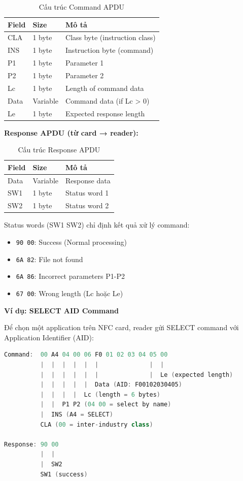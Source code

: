 \begin{table}[h]
\centering
\label{tab:command_apdu}
\begin{tabular}{|l|l|l|}
\hline
\textbf{Field} & \textbf{Size} & \textbf{Mô tả} \\
\hline
CLA & 1 byte & Class byte (instruction class) \\
INS & 1 byte & Instruction byte (command) \\
P1 & 1 byte & Parameter 1 \\
P2 & 1 byte & Parameter 2 \\
Lc & 1 byte & Length of command data \\
Data & Variable & Command data (if Lc > 0) \\
Le & 1 byte & Expected response length \\
\hline
\end{tabular}
\caption{Cấu trúc Command APDU}
\end{table}

\textbf{Response APDU (từ card → reader):}

\begin{table}[h]
\centering
\label{tab:response_apdu}
\begin{tabular}{|l|l|l|}
\hline
\textbf{Field} & \textbf{Size} & \textbf{Mô tả} \\
\hline
Data & Variable & Response data \\
SW1 & 1 byte & Status word 1 \\
SW2 & 1 byte & Status word 2 \\
\hline
\end{tabular}
\caption{Cấu trúc Response APDU}
\end{table}

Status words (SW1 SW2) chỉ định kết quả xử lý command:
\begin{itemize}
    \item \texttt{90 00}: Success (Normal processing)
    \item \texttt{6A 82}: File not found
    \item \texttt{6A 86}: Incorrect parameters P1-P2
    \item \texttt{67 00}: Wrong length (Lc hoặc Le)
\end{itemize}

\textbf{Ví dụ: SELECT AID Command}

Để chọn một application trên NFC card, reader gửi SELECT command với Application Identifier (AID):

\noindent\begin{minipage}{\linewidth}
\begin{lstlisting}[language=C++, caption={NFC SELECT AID Command}]
Command:  00 A4 04 00 06 F0 01 02 03 04 05 00
          |  |  |  |  |  |              |  |
          |  |  |  |  |  |              |  Le (expected length)
          |  |  |  |  |  Data (AID: F00102030405)
          |  |  |  |  Lc (length = 6 bytes)
          |  |  P1 P2 (04 00 = select by name)
          |  INS (A4 = SELECT)
          CLA (00 = inter-industry class)

Response: 90 00
          |  |
          |  SW2
          SW1 (success)
\end{lstlisting}
\end{minipage}


